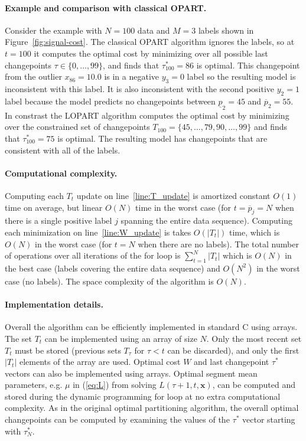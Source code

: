 \documentclass[12pt]{article}
\begin{document}
\paragraph{Example and comparison with classical OPART.} Consider the example with $N=100$ data and $M=3$ labels shown in Figure~\ref{fig:signal-cost}. 
The classical OPART algorithm ignores the labels, so at $t=100$ it computes the optimal cost by minimizing over all possible last changepoints $\tau\in\{0,\dots, 99\}$, and finds that $\tau^*_{100}=86$ is optimal. 
This changepoint from the outlier $x_{86}=10.0$ is in a negative $y_3=0$ label so the resulting model is inconsistent with this label.
It is also inconsistent with the second positive $y_2=1$ label because the model predicts no changepoints between $\underline p_2=45$ and $\overline p_2=55$.
In constrast the LOPART algorithm computes the optimal cost by minimizing over the constrained set of changepoints $T_{100}=\{45, \dots, 79, 90, \dots, 99\}$ and finds that $\tau^*_{100}=75$ is optimal. 
The resulting model has changepoints that are consistent with all of the labels.

\paragraph{Computational complexity.}
Computing each $T_t$ update on line~\ref{line:T_update} is amortized constant $O(1)$ time on average, but linear $O(N)$ time in the worst case (for $t=\overline p_j=N$ when there is a single positive label $j$ spanning the entire data sequence). 
Computing each minimization on line~\ref{line:W_update} is takes $O(|T_t|)$ time, which is $O(N)$ in the worst case (for $t=N$ when there are no labels). 
The total number of operations over all iterations of the for loop is $\sum_{t=1}^N |T_t|$ which is $O(N)$ in the best case (labels covering the entire data sequence) and $O(N^2)$ in the worst case (no labels).
The space complexity of the algorithm is $O(N)$.

\paragraph{Implementation details.} 
Overall the algorithm can be efficiently implemented in standard C using arrays.
The set $T_t$ can be implemented using an array of size $N$. 
Only the most recent set $T_t$ must be stored (previous sets $T_\tau$ for $\tau<t$ can be discarded), and only the first $|T_t|$ elements of the array are used.
Optimal cost $W$ and last changepoint $\tau^*$ vectors can also be implemented using arrays.
Optimal segment mean parameters, e.g. $\mu$ in (\ref{eq:L}) from solving $L(\tau+1,t,\mathbf x)$, can be computed and stored during the dynamic programming for loop at no extra computational complexity.
As in the original optimal partitioning algorithm, the overall optimal changepoints can be computed by examining the values of the $\tau^*$ vector starting with $\tau^*_N$. 
\end{document}

